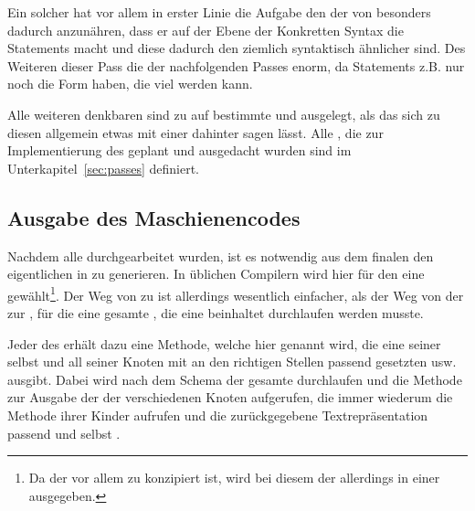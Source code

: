 
Ein solcher  hat vor allem in erster Linie die Aufgabe den  der  von  besonders dadurch anzunähren, dass er auf der Ebene der Konkretten Syntax die Statements  macht und diese dadurch den ziemlich  syntaktisch ähnlicher sind. Des Weiteren  dieser Pass die  der nachfolgenden Passes enorm, da Statements z.B. nur noch die Form  haben, die viel  werden kann.

Alle weiteren denkbaren  sind zu  auf bestimmte  und  ausgelegt, als das sich zu diesen allgemein etwas mit einer  dahinter sagen lässt. Alle , die zur Implementierung des  geplant und ausgedacht wurden sind im Unterkapitel~\ref{sec:passes} definiert.

\subsection{Ausgabe des Maschienencodes}

Nachdem alle  durchgearbeitet wurden, ist es notwendig aus dem finalen  den eigentlichen  in  zu generieren. In üblichen Compilern wird hier für den  eine  gewählt\footnote{Da der  vor allem zu  konzipiert ist, wird bei diesem der  allerdings in einer  ausgegeben.}. Der Weg von  zu   ist allerdings wesentlich einfacher, als der Weg von der  zur , für die eine gesamte , die eine  beinhaltet durchlaufen werden musste.

Jeder  des  erhält dazu eine Methode, welche hier  genannt wird, die eine  seiner selbst und all seiner Knoten mit an den richtigen Stellen passend gesetzten  \smalltt{;} usw. ausgibt. Dabei wird nach dem  Schema der gesamte  durchlaufen und die Methode  zur Ausgabe der  der verschiedenen Knoten aufgerufen, die immer wiederum die Methode  ihrer Kinder aufrufen und die zurückgegebene Textrepräsentation passend  und selbst .


